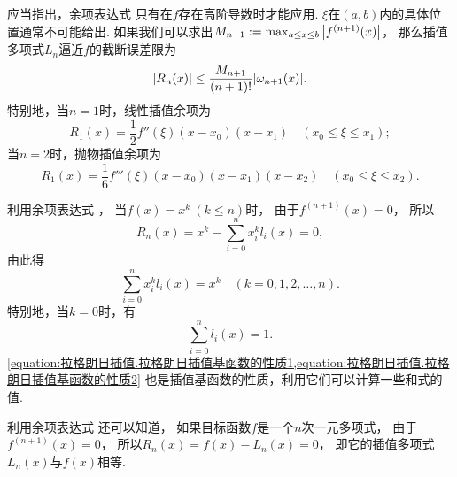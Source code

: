 应当指出，余项表达式 
只有在\(f\)存在高阶导数时才能应用.
\(\xi\)在\((a,b)\)内的具体位置通常不可能给出.
如果我们可以求出\(M_{n+1} := \max_{a \leq x \leq b} \abs{f^{(n+1)}(x)}\)，
那么插值多项式\(L_n\)逼近\(f\)的截断误差限为\begin{equation}
	\abs{R_n(x)}
	\leq \frac{M_{n+1}}{(n+1)!} \abs{\omega_{n+1}(x)}.
\end{equation}
特别地，当\(n=1\)时，线性插值余项为\begin{equation}\label{equation:拉格朗日插值.线性插值余项}
	R_1(x) = \frac12 f''(\xi) (x-x_0)(x-x_1)
	\quad(x_0 \leq \xi \leq x_1);
\end{equation}
当\(n=2\)时，抛物插值余项为\begin{equation}
	R_1(x) = \frac16 f'''(\xi) (x-x_0)(x-x_1)(x-x_2)
	\quad(x_0 \leq \xi \leq x_2).
\end{equation}

利用余项表达式 ，
当\(f(x) = x^k\ (k \leq n)\)时，
由于\(f^{(n+1)}(x) = 0\)，
所以\begin{equation*}
	R_n(x)
	= x^k - \sum_{i=0}^n x_i^k l_i(x)
	= 0,
\end{equation*}
由此得\begin{equation}\label{equation:拉格朗日插值.拉格朗日插值基函数的性质1}
	\sum_{i=0}^n x_i^k l_i(x)
	= x^k
	\quad(k=0,1,2,\dotsc,n).
\end{equation}
特别地，当\(k=0\)时，有\begin{equation}\label{equation:拉格朗日插值.拉格朗日插值基函数的性质2}
	\sum_{i=0}^n l_i(x) = 1.
\end{equation}
\cref{equation:拉格朗日插值.拉格朗日插值基函数的性质1,equation:拉格朗日插值.拉格朗日插值基函数的性质2}
也是插值基函数的性质，利用它们可以计算一些和式的值.

利用余项表达式  还可以知道，
如果目标函数\(f\)是一个\(n\)次一元多项式，
由于\(f^{(n+1)}(x) = 0\)，
所以\(R_n(x) = f(x) - L_n(x) = 0\)，
即它的插值多项式\(L_n(x)\)与\(f(x)\)相等.

